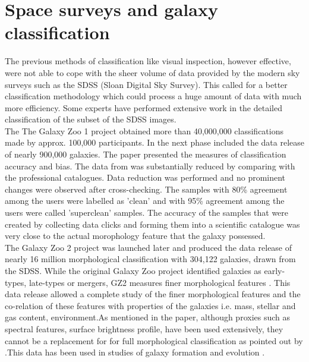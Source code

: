 \documentclass[a4paper,12pt]{report}
\begin{document}
\section{Space surveys and galaxy classification}
\hspace*{0.5 in}The previous methods of classification like visual inspection, however effective, were not able to cope with the sheer volume of data provided by the modern sky surveys such as the SDSS (Sloan Digital Sky Survey). This called for a better classification methodology which could process a huge amount of data with much more efficiency. Some experts have performed extensive work in the detailed classification of the subset of the SDSS images.\\
\hspace*{0.5 in}The The Galaxy Zoo 1 project obtained more than 40,000,000 classifications made by approx. 100,000 participants. In the next phase \cite{Lintott_2010} included the data release of nearly 900,000 galaxies. The paper presented the measures of classification accuracy and bias. The data from \cite{2008MNRAS.389.1179L} was substantially reduced by comparing with the professional catalogues. Data reduction was performed and no prominent changes were observed after cross-checking. The samples with 80\% agreement among the users were labelled as 'clean' and with 95\% agreement among the users were called 'superclean' samples. The accuracy of the samples that were created by collecting data clicks and forming them into a scientific catalogue was very close to the actual morophology feature that the galaxy possessed.\\
\hspace*{0.5 in}The Galaxy Zoo 2 project was launched later and \cite{Willett_2013} produced the data release of nearly 16 million morphological classification with 304,122 galaxies, drawn from the SDSS. While the original Galaxy Zoo project identified galaxies as early-types, late-types or mergers, GZ2 measures finer morphological features \cite{Willett_2013}. This data release allowed a complete study of the finer morphological features and the co-relation of these features with properties of the galaxies i.e. mass, stellar and gas content, environment.As mentioned in the paper, although proxies such as spectral features, surface brightness profile, have been used extensively, they cannot be a replacement for for full morphological classification as pointed out by \cite{Lintott_2010}.This data has been used in studies of galaxy formation and evolution \citep{Land_et_all_2008,Schawinski,Willett_2015}.\\
\end{document}
